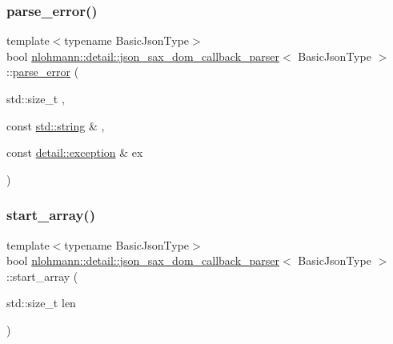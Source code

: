 \mbox{\label{classnlohmann_1_1detail_1_1json__sax__dom__callback__parser_aac6e64f0b59c9150cde974e182d5ecab}} 
\subsubsection{\texorpdfstring{parse\+\_\+error()}{parse\_error()}}
{\footnotesize\ttfamily template$<$typename Basic\+Json\+Type$>$ \\
bool \hyperlink{classnlohmann_1_1detail_1_1json__sax__dom__callback__parser}{nlohmann\+::detail\+::json\+\_\+sax\+\_\+dom\+\_\+callback\+\_\+parser}$<$ Basic\+Json\+Type $>$\+::\hyperlink{classnlohmann_1_1detail_1_1parse__error}{parse\+\_\+error} (\begin{DoxyParamCaption}\item[{std\+::size\+\_\+t}]{,  }\item[{const \hyperlink{namespacenlohmann_1_1detail_a1ed8fc6239da25abcaf681d30ace4985ab45cffe084dd3d20d928bee85e7b0f21}{std\+::string} \&}]{,  }\item[{const \hyperlink{classnlohmann_1_1detail_1_1exception}{detail\+::exception} \&}]{ex }\end{DoxyParamCaption})\hspace{0.3cm}{\ttfamily [inline]}}

\mbox{\label{classnlohmann_1_1detail_1_1json__sax__dom__callback__parser_a5255b98ba8282e3625968f91cff9d3d0}} 
\subsubsection{\texorpdfstring{start\+\_\+array()}{start\_array()}}
{\footnotesize\ttfamily template$<$typename Basic\+Json\+Type$>$ \\
bool \hyperlink{classnlohmann_1_1detail_1_1json__sax__dom__callback__parser}{nlohmann\+::detail\+::json\+\_\+sax\+\_\+dom\+\_\+callback\+\_\+parser}$<$ Basic\+Json\+Type $>$\+::start\+\_\+array (\begin{DoxyParamCaption}\item[{std\+::size\+\_\+t}]{len }\end{DoxyParamCaption})\hspace{0.3cm}{\ttfamily [inline]}}

